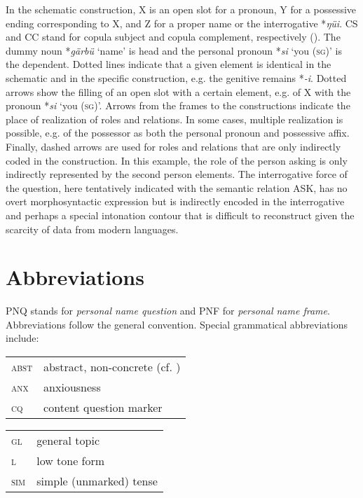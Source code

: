 \documentclass[output=paper,colorlinks,citecolor=brown]{langscibook}
\begin{document}
In the schematic construction, X is an open slot for a pronoun, Y for a possessive ending corresponding to X, and Z for a proper name or the interrogative *\textit{ŋüi}. CS and CC stand for copula subject and copula complement, respectively (\citealt{Dixon2010a}). The dummy noun *\textit{gärbü} ‘name’ is head and the personal pronoun *\textit{si} ‘you (\textsc{sg})’ is the dependent. Dotted lines indicate that a given element is identical in the schematic and in the specific construction, e.g. the genitive remains *\textit{-i}. Dotted arrows show the filling of an open slot with a certain element, e.g. of X with the pronoun *\textit{si} ‘you (\textsc{sg})’. Arrows from the frames to the constructions indicate the place of realization of roles and relations. In some cases, multiple realization is possible, e.g. of the possessor as both the personal pronoun and possessive affix. Finally, dashed arrows are used for roles and relations that are only indirectly coded in the construction. In this example, the role of the person asking is only indirectly represented by the second person elements. The interrogative force of the question, here tentatively indicated with the semantic relation ASK, has no overt morphosyntactic expression but is indirectly encoded in the interrogative and perhaps a special intonation contour that is difficult to reconstruct given the scarcity of data from modern languages.


\section*{Abbreviations}

PNQ stands for \textit{personal name question} and PNF for \textit{personal name frame}. Abbreviations follow the general convention. Special grammatical abbreviations include:\smallskip\\

\noindent\begin{tabularx}{.5\textwidth}{@{}lQ}
\textsc{abst} & abstract, non-concrete (cf. \citealt{Munshi2006})\\
\textsc{anx} & anxiousness \citep{Prins2017}\\
\textsc{cq} & content question marker\\
\end{tabularx}%
\begin{tabularx}{.50\textwidth}{lQ@{}}
\textsc{gl} & general topic \citep{Lock2011}\\
\textsc{l} & low tone form \citep{Paperno2014}\\
\textsc{sim} & simple (unmarked) tense \citep{Coler2014}\\
\end{tabularx}
\end{document}
